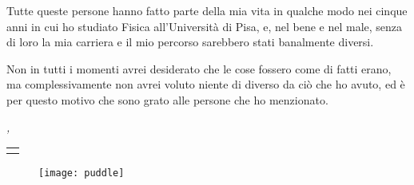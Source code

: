 Tutte queste persone hanno fatto parte della mia vita in qualche modo nei cinque anni in cui ho studiato Fisica all'Università di Pisa, e, nel bene e nel male, senza di loro la mia carriera e il mio percorso sarebbero stati banalmente diversi.

Non in tutti i momenti avrei desiderato che le cose fossero come di fatti erano, ma complessivamente non avrei voluto niente di diverso da ciò che ho avuto, ed è per questo motivo che sono grato alle persone che ho menzionato.

\bigskip
 
\noindent\textit{\myLocation, \MakeTextLowercase{\myTime}}

\smallskip
\vspace*{-20pt}

\begin{flushright}
	\begin{tabular}{m{5cm}}
		\\ \hline
		\centering\myName \\
	\end{tabular}
\end{flushright}

\pagebreak

\vfill

\begin{figure}
	\centering
	\texttt{[image: puddle]}
\end{figure}

\vfill
